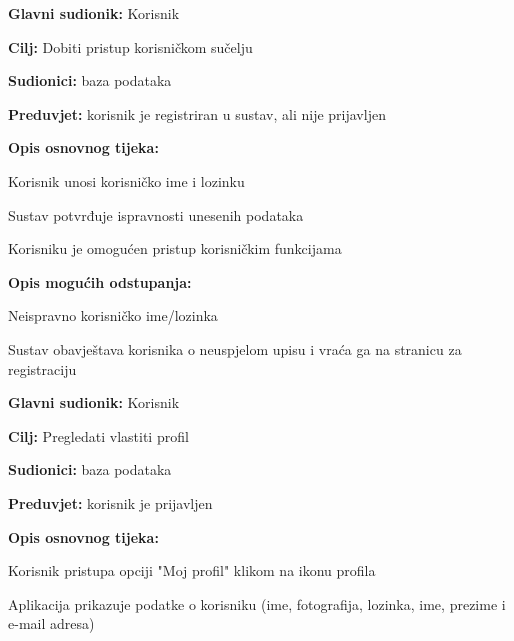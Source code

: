 					\noindent {}
					\begin{packed_item}
						
						\item \textbf{Glavni sudionik: }Korisnik
						\item \textbf{Cilj:} Dobiti pristup korisničkom sučelju
						\item \textbf{Sudionici:} baza podataka
						\item \textbf{Preduvjet:} korisnik je registriran u sustav, ali nije prijavljen
						\item \textbf{Opis osnovnog tijeka:}
						\item[] \begin{packed_enum}
							\item Korisnik unosi korisničko ime i lozinku
							\item Sustav potvrđuje ispravnosti unesenih podataka
							\item Korisniku je omogućen pristup korisničkim funkcijama
						\end{packed_enum}
						
						\item  \textbf{Opis mogućih odstupanja:}
						
						\item[] \begin{packed_item}
							
							\item[2.a] Neispravno korisničko ime/lozinka
							\item[] \begin{packed_enum}
								
								\item Sustav obavještava korisnika o neuspjelom upisu i vraća ga na stranicu za registraciju
								
							\end{packed_enum}
						\end{packed_item}
					\end{packed_item}
					
					\noindent \underbar{\textbf{UC6 - Pregled profila}}
					\begin{packed_item}
						
						\item \textbf{Glavni sudionik: }Korisnik
						\item \textbf{Cilj:} Pregledati vlastiti profil
						\item \textbf{Sudionici:} baza podataka
						\item \textbf{Preduvjet:} korisnik je prijavljen
						\item \textbf{Opis osnovnog tijeka:}
						\item[] \begin{packed_enum}
							\item Korisnik pristupa opciji "Moj profil" klikom na ikonu profila
							\item Aplikacija prikazuje podatke o korisniku (ime, fotografija, lozinka, ime, prezime i e-mail adresa)
						\end{packed_enum}
					\end{packed_item}
					
